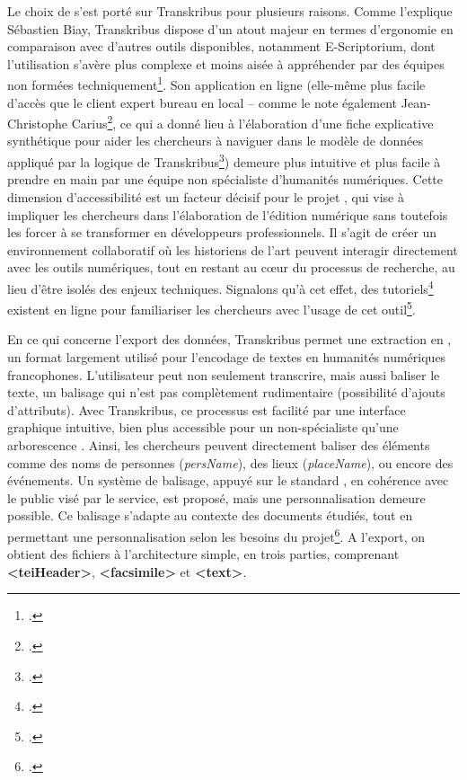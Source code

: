 Le choix de \pense s’est porté sur Transkribus pour plusieurs raisons. Comme l'explique Sébastien Biay, Transkribus dispose d’un atout majeur en termes d’ergonomie en comparaison avec d’autres outils disponibles, notamment E-Scriptorium, dont l’utilisation s’avère plus complexe et moins aisée à appréhender par des équipes non formées techniquement\footcite[p.24]{biay_chaine_2022}. Son application en ligne (elle-même plus facile d’accès que le client expert bureau en local – comme le note également Jean-Christophe Carius\footcite{carius_plateforme_2020}, ce qui a donné lieu à l’élaboration d’une fiche explicative synthétique pour aider les chercheurs à naviguer dans le modèle de données appliqué par la logique de Transkribus\footcite{inha_schema_nodate}) demeure plus intuitive et plus facile à prendre en main par une équipe non spécialiste d’humanités numériques.  Cette dimension d’accessibilité est un facteur décisif pour le projet \pense, qui vise à impliquer les chercheurs dans l'élaboration de l'édition numérique sans toutefois les forcer à se transformer en développeurs professionnels. Il s'agit de créer un environnement collaboratif où les historiens de l'art peuvent interagir directement avec les outils numériques, tout en restant au cœur du processus de recherche, au lieu d'être isolés des enjeux techniques. 
Signalons qu’à cet effet, des tutoriels\footcite{carius_plateforme_2020} existent en ligne pour familiariser les chercheurs avec l’usage de cet outil\footcite{perrin_tutoriel_2019}.

En ce qui concerne l’export des données, Transkribus permet une extraction en \tei, un format largement utilisé pour l’encodage de textes en humanités numériques francophones. L’utilisateur peut non seulement transcrire, mais aussi baliser le texte, un balisage qui n’est pas complètement rudimentaire (possibilité d’ajouts d’attributs). Avec Transkribus, ce processus est facilité par une interface graphique intuitive, bien plus accessible pour un non-spécialiste qu’une arborescence \xml. Ainsi, les chercheurs peuvent directement baliser des éléments comme des noms de personnes (\textit{persName}), des lieux (\textit{placeName}), ou encore des événements. Un système de balisage, appuyé sur le standard \tei, en cohérence avec le public visé par le service, est proposé, mais une personnalisation demeure possible. Ce balisage s’adapte au contexte des documents étudiés, tout en permettant une personnalisation selon les besoins du projet\footcite{noauthor_pour_nodate}. 
A l’export, on obtient des fichiers \tei à l’architecture simple, en trois parties, comprenant \textbf{<teiHeader>}, \textbf{<facsimile>} et \textbf{<text>}. 

